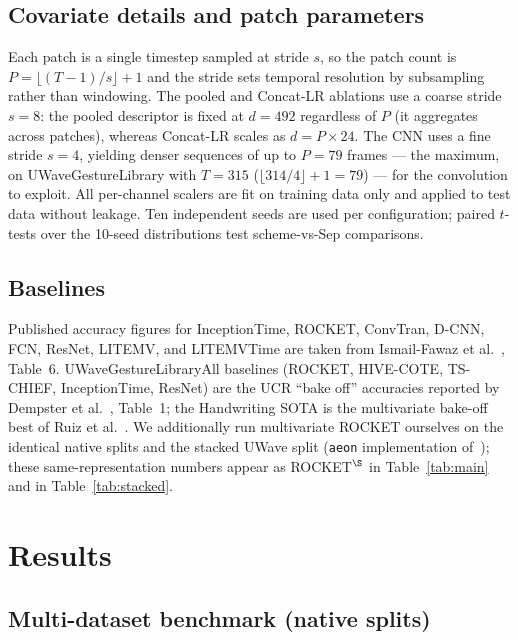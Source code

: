 \documentclass[conference,compsoc]{IEEEtran}
\begin{document}
\subsection{Covariate details and patch parameters}

Each patch is a single timestep sampled at stride $s$, so the patch
count is $P = \lfloor (T-1)/s \rfloor + 1$ and the stride sets temporal
resolution by subsampling rather than windowing.
The pooled and Concat-LR ablations use a coarse stride $s = 8$: the
pooled descriptor is fixed at $d = 492$ regardless of $P$ (it
aggregates across patches), whereas Concat-LR scales as $d = P \times
24$. The CNN uses a fine stride $s = 4$, yielding denser sequences of
up to $P = 79$ frames --- the maximum, on UWaveGestureLibrary with
$T = 315$ ($\lfloor 314/4 \rfloor + 1 = 79$) --- for the convolution
to exploit.
All per-channel scalers are fit on training data only and applied
to test data without leakage.
Ten independent seeds are used per configuration; paired $t$-tests
over the 10-seed distributions test scheme-vs-Sep comparisons.

\subsection{Baselines}

Published accuracy figures for InceptionTime, ROCKET,
ConvTran, D-CNN, FCN, ResNet, LITEMV, and LITEMVTime are taken from
Ismail-Fawaz et al.~\cite{ismail2025lite}, Table~6.
UWaveGestureLibraryAll baselines (ROCKET, HIVE-COTE, TS-CHIEF,
InceptionTime, ResNet) are the UCR ``bake off'' accuracies reported by
Dempster et al.~\cite{dempster2020rocket}, Table~1; the Handwriting
SOTA is the multivariate bake-off best of Ruiz et
al.~\cite{ruiz2020bakeoff}.
We additionally run multivariate ROCKET ourselves on the identical
native splits and the stacked UWave split (\texttt{aeon}
implementation of~\cite{dempster2020rocket}); these same-representation
numbers appear as ROCKET$^\S$ in Table~\ref{tab:main} and in
Table~\ref{tab:stacked}.

\section{Results}
\label{sec:results}

\subsection{Multi-dataset benchmark (native splits)}
\label{sec:main_results}
\end{document}

